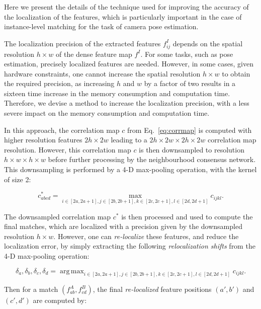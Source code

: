 \documentclass{article}
\DeclareMathOperator*{\argmax}{arg\,max}
\begin{document}
Here we present the details of the technique used for improving the accuracy of the localization of the features, which is particularly important in the case of instance-level matching for the task of camera pose estimation.

The localization precision of the extracted features $f^I_{ij}$ depends on the spatial resolution $h\times w$ of the dense feature map $f^I$. For some tasks, such as pose estimation, precisely localized features are needed. However, in some cases, given hardware constraints, one cannot increase the spatial resolution $h\times w$ to obtain the required precision, as increasing $h$ and $w$ by a factor of two results in a sixteen time increase in the memory consumption and computation time. Therefore, we devise a method to increase the localization precision, with a less severe impact on the memory consumption and computation time.

In this approach, the correlation map $c$ from Eq.~\eqref{eq:corrmap} is computed with higher resolution features $2h
\times 2w$ leading to a $2h \times 2w\times 2h\times 2w$ correlation map resolution. However, this correlation map $c$ is then downsampled to resolution $h\times w\times h\times w$ before further processing by the neighbourhood consensus network. This downsampling is performed by a 4-D max-pooling operation, with the kernel of size 2:

\begin{equation}
    c^{*}_{abcd}=\max_{i\in[2a,2a+1],j\in[2b,2b+1],k\in[2c,2c+1],l\in[2d,2d+1]} c_{ijkl}.
\end{equation}

The downsampled correlation map $c^{*}$ is then processed and used to compute the final matches, which are localized with a precision given by the downsampled resolution $h\times w$.
However, one can \emph{re-localize} these features, and reduce the localization error, by simply extracting the following \emph{relocalization shifts} from the 4-D max-pooling operation:

\begin{equation}
    \delta_a,\delta_b,\delta_c,\delta_d =\argmax_{i\in[2a,2a+1],j\in[2b,2b+1],k\in[2c,2c+1],l\in[2d,2d+1]} c_{ijkl}.
\end{equation}

Then for a match $(f^A_{ab},f^B_{cd})$, the final \emph{re-localized} feature positions $(a',b')$ and $(c',d')$ are computed by:
\end{document}
